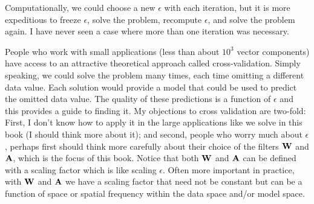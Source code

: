\par
Computationally, we could choose a new $\epsilon$ with each iteration,
but it is more expeditious
to freeze $\epsilon$, solve the problem,
recompute $\epsilon$, and solve the problem again.
I have never seen a case where more than one iteration was necessary.

\par
People who work with small applications
(less than about $10^3$ vector components)
have access to an attractive theoretical approach
called cross-validation.
Simply speaking,
we could solve the problem many times,
each time omitting a different data value.
Each solution would provide a model
that could be used to predict
the omitted data value.
The quality of these predictions
is a function of $\epsilon$
and this provides a guide to finding it.
My objections to cross validation are two-fold:
First, I don't know how to apply it in the large applications
like we solve in this book
(I should think more about it);
and second,
people who worry much about $\epsilon$,
perhaps first should think 
more carefully about
their choice of the filters $\bold W$ and $\bold A$,
which is the focus of this book.
Notice that both $\bold W$ and $\bold A$
can be defined with a scaling factor which is like scaling $\epsilon$.
Often more important in practice,
with $\bold W$ and $\bold A$
we have a scaling factor that need not be constant but
can be a function of space or spatial frequency
within the data space and/or model space.


\begin{comment}

\section{References}

\reference{Gill, P.E., Murray, W., and Wright, M.H., 1981,
        Practical optimization:  Academic Press.
        }
\reference{Hestenes, M.R., and Stiefel, E., 1952,
        Methods of
        conjugate gradients for solving linear systems:
        J. Res. Natl. Bur. Stand., {\bf 49}, 409-436.
        }
\reference{Luenberger, D.G., 1973,
        Introduction to linear and nonlinear programming:
        Addison-Wesley.
        }
\reference{Nolet, G., 1985,
        Solving or resolving inadequate and noisy
        tomographic systems:
        J. Comp. Phys., {\bf 61}, 463-482.
        }
\reference{Paige, C.C., and Saunders, M.A., 1982a,
        LSQR: an algorithm for sparse linear equations
        and sparse least squares:
        Assn. Comp. Mach. Trans. Mathematical Software,
        {\bf 8,} 43-71.
        }
\reference{Paige, C.C., and Saunders, M.A., 1982b,
        Algorithm 583, LSQR:
        sparse linear equations and least squares problems:
        Assn. Comp. Mach. Trans. Mathematical Software,
        {\bf 8,}  195-209.
        }
\reference{Strang, G., 1986,
        Introduction to applied mathematics:
        Wellesley-Cambridge Press.
        }
\end{comment}

\clearpage

